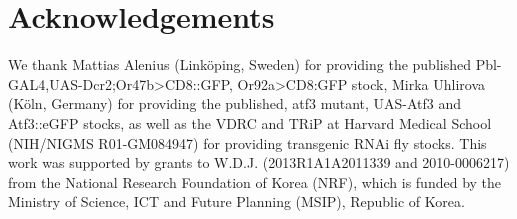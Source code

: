 \section*{Acknowledgements}

We thank Mattias Alenius (Link{\"{o}}ping, Sweden) for providing the published Pbl-GAL4,UAS-Dcr2;Or47b\textgreater{}CD8::GFP, Or92a\textgreater{}CD8:GFP stock, Mirka Uhlirova (K{\"{o}}ln, Germany) for providing the published, atf3 mutant, UAS-Atf3 and Atf3::eGFP stocks, as well as the VDRC and TRiP at Harvard Medical School (NIH/NIGMS R01-GM084947) for providing transgenic RNAi fly stocks.
This work was supported by grants to W.D.J. (2013R1A1A2011339 and 2010-0006217) from the National Research Foundation of Korea (NRF), which is funded by the Ministry of Science, ICT and Future Planning (MSIP), Republic of Korea.